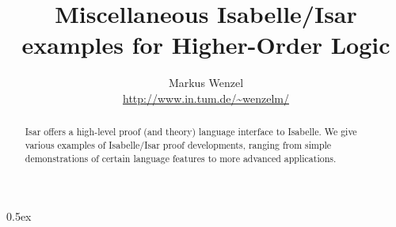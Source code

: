 





\title{Miscellaneous Isabelle/Isar examples for Higher-Order Logic}
\author{Markus Wenzel \\ \url{http://www.in.tum.de/~wenzelm/}}
\maketitle

\begin{abstract}
  Isar offers a high-level proof (and theory) language interface to Isabelle.
  We give various examples of Isabelle/Isar proof developments, ranging from
  simple demonstrations of certain language features to more advanced
  applications.
\end{abstract}

\tableofcontents

\parindent 0pt \parskip 0.5ex


\nocite{isabelle-isar-ref,Wenzel:1999:TPHOL}




